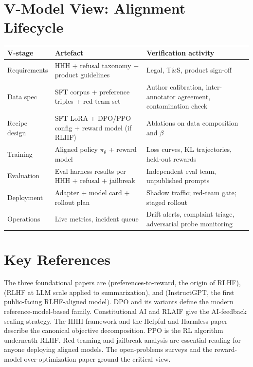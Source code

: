 \section{V-Model View: Alignment Lifecycle}

\begin{center}
\small
\begin{tabular}{p{4.3cm}|p{4.3cm}|p{4.3cm}}
\textbf{V-stage} & \textbf{Artefact} & \textbf{Verification activity}\\\hline
Requirements & HHH + refusal taxonomy + product guidelines & Legal, T\&S, product sign-off \\
Data spec & SFT corpus + preference triples + red-team set & Author calibration, inter-annotator agreement, contamination check \\
Recipe design & SFT-LoRA + DPO/PPO config + reward model (if RLHF) & Ablations on data composition and $\beta$ \\
Training & Aligned policy $\pi_\theta$ + reward model & Loss curves, KL trajectories, held-out rewards \\
Evaluation & Eval harness results per HHH + refusal + jailbreak & Independent eval team, unpublished prompts \\
Deployment & Adapter + model card + rollout plan & Shadow traffic; red-team gate; staged rollout \\
Operations & Live metrics, incident queue & Drift alerts, complaint triage, adversarial probe monitoring \\
\end{tabular}
\end{center}

\section{Key References}

The three foundational papers are \citet{christiano2017deep}
(preferences-to-reward, the origin of RLHF),
\citet{stiennon2020learning} (RLHF at LLM scale applied to
summarization), and \citet{ouyang2022training} (InstructGPT, the
first public-facing RLHF-aligned model). DPO \citep{rafailov2023direct}
and its variants \citep{azar2023general, ethayarajh2024kto,
hong2024orpo, meng2024simpo} define the modern
reference-model-based family. Constitutional AI
\citep{bai2022constitutional} and RLAIF \citep{lee2023rlaif} give
the AI-feedback scaling strategy. The HHH framework
\citep{askell2021general} and the Helpful-and-Harmless paper
\citep{bai2022training} describe the canonical objective
decomposition. PPO \citep{schulman2017ppo} is the RL algorithm
underneath RLHF. Red teaming \citep{ganguli2022redteaming,
perez2022redteaming} and jailbreak analysis
\citep{wei2023jailbroken, zou2023universal} are essential reading
for anyone deploying aligned models. The open-problems surveys
\citep{casper2023open, anwar2024foundational} and the reward-model
over-optimization paper \citep{gao2023scaling} ground the critical
view.

